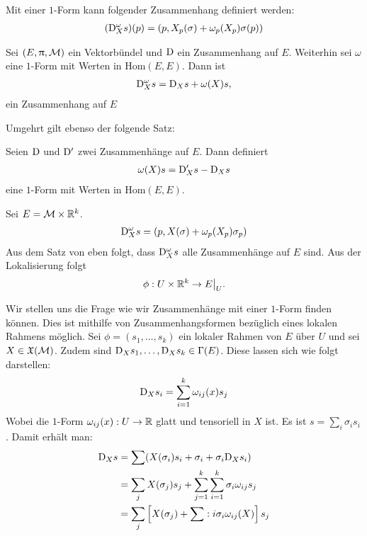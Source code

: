 \begin{defs}
Mit einer $1$-Form kann folgender Zusammenhang definiert werden:
\begin{align}
(\mathrm{D}^\omega_X s)(p) = (p, X_p(\sigma) + \omega_p(X_p) \sigma(p))
\end{align}
\end{defs}

\begin{satz}
\label{satz:zusammenhangausform}
Sei $(E, \uppi, \mathcal{M})$ ein Vektorbündel und $\mathrm{D}$ ein Zusammenhang auf $E$.
Weiterhin sei $\omega$ eine $1$-Form mit Werten in $\mathrm{Hom}(E, E)$.
Dann ist 
\begin{align}
\mathrm{D}^\omega_X s = \mathrm{D}_X s + \omega(X) s,
\end{align}
ein Zusammenhang auf $E$
\end{satz}
Umgehrt gilt ebenso der folgende Satz:
\begin{satz}
Seien $\mathrm{D}$ und $\mathrm{D}'$ zwei Zusammenhänge auf $E$.
Dann definiert 
\begin{align}
\omega(X) s = \mathrm{D}'_X s - \mathrm{D}_X s
\end{align}
eine $1$-Form mit Werten in $\mathrm{Hom}(E, E)$.
\end{satz}
\begin{bsp}
Sei $E = \mathcal{M} \times \mathbb{R}^k$. 
\begin{align}
\mathrm{D}^\omega_X s = (p, X(\sigma) + \omega_p (X_p)\sigma_p)
\end{align}
Aus dem Satz von eben folgt, dass $\mathrm{D}^\omega_X s$ alle Zusammenhänge auf $E$ sind.
Aus der Lokalisierung folgt
\begin{align}
\phi : U \times \mathbb{R}^k \to E\big\vert_U.
\end{align}
\end{bsp}
Wir stellen uns die Frage wie wir Zusammenhänge mit einer $1$-Form finden können.
Dies ist mithilfe von Zusammenhangsformen bezüglich eines lokalen Rahmens möglich.
Sei $\phi = (s_1, \dots, s_k)$ ein lokaler Rahmen von $E$ über $U$ und sei $X \in \mathfrak{X}(\mathcal{M})$.
Zudem sind $\mathrm{D}_X s_1, \dots, \mathrm{D}_X s_k \in \Gamma(E)$.
Diese lassen sich wie folgt darstellen:
\begin{align}
\mathrm{D}_X s_i = \sum_{i=1}^k \omega_{ij}(x) s_j
\end{align}
Wobei die $1$-Form $\omega_{ij}(x): U \to \mathbb{R}$ glatt und tensoriell in $X$ ist.
Es ist $s = \sum_i \sigma_i s_i$. 
Damit erhält man:
\begin{align}
\mathrm{D}_X s &= \sum (X(\sigma_i)s_i + \sigma_i + \sigma_i \mathrm{D}_X s_i)\\
&= \sum_j X(\sigma_j)s_j + \sum_{j=1}^k \sum_{i=1}^k \sigma_i \omega_{ij} s_j\\
&= \sum_j \left[ X(\sigma_j) + \sum:i \sigma_i \omega_{ij}(X) \right] s_j
\end{align}


